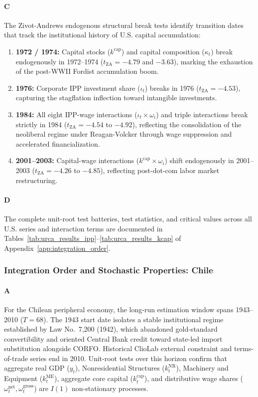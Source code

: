 \paragraph{C}
The Zivot-Andrews endogenous structural break tests identify transition dates that track the institutional history of U.S. capital accumulation:
\begin{enumerate}
	\item \textbf{1972 / 1974:} Capital stocks ($k^{\text{cap}}$) and capital composition ($\kappa_t$) break endogenously in 1972--1974 ($t_{\text{ZA}} = -4.79$ and $-3.63$), marking the exhaustion of the post-WWII Fordist accumulation boom.
	\item \textbf{1976:} Corporate IPP investment share ($\iota_t$) breaks in 1976 ($t_{\text{ZA}} = -4.53$), capturing the stagflation inflection toward intangible investments.
	\item \textbf{1984:} All eight IPP-wage interactions ($\iota_t \times \omega_i$) and triple interactions break strictly in 1984 ($t_{\text{ZA}} = -4.54$ to $-4.92$), reflecting the consolidation of the neoliberal regime under Reagan-Volcker through wage suppression and accelerated financialization.
	\item \textbf{2001--2003:} Capital-wage interactions ($k^{\text{cap}} \times \omega_i$) shift endogenously in 2001--2003 ($t_{\text{ZA}} = -4.26$ to $-4.85$), reflecting post-dot-com labor market restructuring.
\end{enumerate}

\paragraph{D}
The complete unit-root test batteries, test statistics, and critical values across all U.S. series and interaction terms are documented in Tables~\ref{tab:urca_results_ipp}--\ref{tab:urca_results_kcap} of Appendix~\ref{app:integration_order}.

\subsubsection{Integration Order and Stochastic Properties: Chile}
\label{sec:43:integration_order_cl}

\paragraph{A}
For the Chilean peripheral economy, the long-run estimation window spans 1943--2010 ($T = 68$). The 1943 start date isolates a stable institutional regime established by Law No.~7,200 (1942), which abandoned gold-standard convertibility and oriented Central Bank credit toward state-led import substitution alongside CORFO. Historical ClioLab external constraint and terms-of-trade series end in 2010. Unit-root tests over this horizon confirm that aggregate real GDP ($y_t$), Nonresidential Structures ($k^{\text{NR}}_t$), Machinery and Equipment ($k^{\text{ME}}_t$), aggregate core capital ($k^{\text{cap}}_t$), and distributive wage shares ($\omega^{\text{net}}_t, \omega^{\text{gross}}_t$) are $I(1)$ non-stationary processes.

